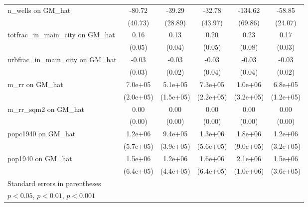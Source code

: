 \begin{table}[htbp]
\begin{tabular}{l*{5}{c}}
\addlinespace
n\_wells on GM\_hat&   -80.72\sym{*}  &   -39.29         &   -32.78         &  -134.62         &   -58.85\sym{*}  \\
                &  (40.73)         &  (28.89)         &  (43.97)         &  (69.86)         &  (24.07)         \\
\addlinespace
totfrac\_in\_main\_city on GM\_hat&     0.16\sym{**} &     0.13\sym{***}&     0.20\sym{***}&     0.23\sym{**} &     0.17\sym{***}\\
                &   (0.05)         &   (0.04)         &   (0.05)         &   (0.08)         &   (0.03)         \\
\addlinespace
urbfrac\_in\_main\_city on GM\_hat&    -0.03         &    -0.03         &    -0.03         &    -0.03         &    -0.03         \\
                &   (0.03)         &   (0.02)         &   (0.04)         &   (0.04)         &   (0.02)         \\
\addlinespace
m\_rr on GM\_hat  &  7.0e+05\sym{***}&  5.1e+05\sym{***}&  7.3e+05\sym{**} &  1.0e+06\sym{**} &  6.8e+05\sym{***}\\
                &(2.0e+05)         &(1.5e+05)         &(2.2e+05)         &(3.2e+05)         &(1.2e+05)         \\
\addlinespace
m\_rr\_sqm2 on GM\_hat&     0.00         &     0.00         &     0.00         &     0.00         &     0.00\sym{**} \\
                &   (0.00)         &   (0.00)         &   (0.00)         &   (0.00)         &   (0.00)         \\
\addlinespace
popc1940 on GM\_hat&  1.2e+06\sym{*}  &  9.4e+05\sym{*}  &  1.3e+06\sym{*}  &  1.8e+06\sym{*}  &  1.2e+06\sym{***}\\
                &(5.7e+05)         &(3.9e+05)         &(5.6e+05)         &(9.0e+05)         &(3.2e+05)         \\
\addlinespace
pop1940 on GM\_hat&  1.5e+06\sym{*}  &  1.2e+06\sym{**} &  1.6e+06\sym{**} &  2.1e+06\sym{*}  &  1.5e+06\sym{***}\\
                &(6.4e+05)         &(4.4e+05)         &(6.4e+05)         &(1.0e+06)         &(3.6e+05)         \\
\bottomrule
\multicolumn{6}{l}{\footnotesize Standard errors in parentheses}\\
\multicolumn{6}{l}{\footnotesize \sym{*} \(p<0.05\), \sym{**} \(p<0.01\), \sym{***} \(p<0.001\)}\\
\end{tabular}
\end{table}
